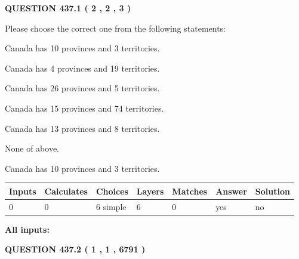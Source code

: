 \documentclass[12pt]{article}
\begin{document}
\vspace{0.2in}
  
{\textbf{\Large{QUESTION
437.1 
 ( 2 , 2 , 3 )
}}}
  
  
Please choose the correct one from the following statements:
 
 
Canada has 10  provinces and 3 territories.
 
 
Canada has   4 provinces and  19 territories.
 
 
Canada has  26 provinces and  5 territories.
 
 
Canada has  15 provinces and  74 territories.
 
 
Canada has  13 provinces and  8 territories.
 
 
 None of above.
 
 
\noindent{}
 
 
Canada has 10  provinces and 3 territories.
 
 
\noindent{}
 
 
   
   
   
   
\noindent\begin{tabular}{|l|l|l|l|l|l|l|}
 \hline
Inputs & Calculates & Choices & Layers & Matches & Answer & Solution \\ \hline
 0  & 
 0  & 
 6
  simple  
  & 
 6  & 
 0  & 
  yes & 
  no 
  \\ \hline
 \end{tabular}
   
   
   
   
\noindent{}
   
   
   
   
\noindent\vspace{0.1in}\hspace{-0.08in} {\textbf{\Large{All inputs: }}}
   
   
  
\vspace{0.2in}
  
{\textbf{\Large{QUESTION
437.2 
 ( 1 , 1 , 6791 )
}}}
  
\end{document}
